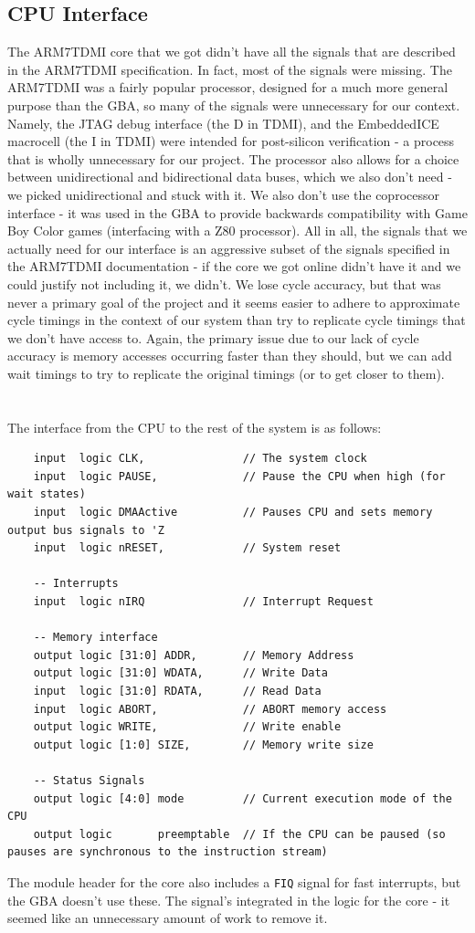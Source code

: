 \documentclass[11pt,a4paper]{article}
\begin{document}
	\subsection{CPU Interface}
	The ARM7TDMI core that we got didn't have all the signals that are described in the ARM7TDMI specification. In fact, most of the signals were missing. The ARM7TDMI was a fairly popular processor, designed for a much more general purpose than the GBA, so many of the signals were unnecessary for our context. Namely, the JTAG debug interface (the D in TDMI), and the EmbeddedICE macrocell (the I in TDMI) were intended for post-silicon verification - a process that is wholly unnecessary for our project. The processor also allows for a choice between unidirectional and bidirectional data buses, which we also don't need - we picked unidirectional and stuck with it. We also don't use the coprocessor interface - it was used in the GBA to provide backwards compatibility with Game Boy Color games (interfacing with a Z80 processor). All in all, the signals that we actually need for our interface is an aggressive subset of the signals specified in the ARM7TDMI documentation - if the core we got online didn't have it and we could justify not including it, we didn't. We lose cycle accuracy, but that was never a primary goal of the project and it seems easier to adhere to approximate cycle timings in the context of our system than try to replicate cycle timings that we don't have access to. Again, the primary issue due to our lack of cycle accuracy is memory accesses occurring faster than they should, but we can add wait timings to try to replicate the original timings (or to get closer to them).\\\\\\
	The interface from the CPU to the rest of the system is as follows:
	\begin{verbatim}
	input  logic CLK,          		// The system clock
	input  logic PAUSE,        		// Pause the CPU when high (for wait states)
	input  logic DMAActive     		// Pauses CPU and sets memory output bus signals to 'Z
	input  logic nRESET,     		// System reset
	
	-- Interrupts
	input  logic nIRQ          		// Interrupt Request
	
	-- Memory interface
	output logic [31:0] ADDR, 		// Memory Address
	output logic [31:0] WDATA,		// Write Data
	input  logic [31:0] RDATA, 		// Read Data
	input  logic ABORT,       		// ABORT memory access
	output logic WRITE,        		// Write enable
	output logic [1:0] SIZE,   		// Memory write size
	
	-- Status Signals
	output logic [4:0] mode         // Current execution mode of the CPU
	output logic       preemptable  // If the CPU can be paused (so pauses are synchronous to the instruction stream)
	\end{verbatim}
	The module header for the core also includes a \texttt{FIQ} signal for fast interrupts, but the GBA doesn't use these. The signal's integrated in the logic for the core - it seemed like an unnecessary amount of work to remove it.
	
\end{document}
